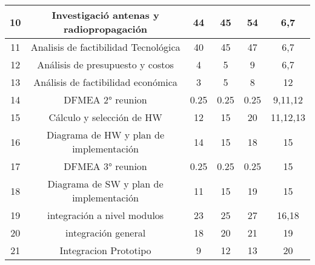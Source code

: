 \begin{table}[H]
\begin{tabular}{|c|c|c|c|c|c|}
10          & Investigació antenas y radiopropagación & 44                          & 45                & 54                          & 6,7                                       \\ \hline
11          & Analisis de factibilidad Tecnológica    & 40                          & 45                & 47                          & 6,7                                       \\ \hline
12          & Análisis de presupuesto y costos        & 4                           & 5                 & 9                           & 6,7                                       \\ \hline
13          & Análisis de factibilidad económica      & 3                           & 5                 & 8                           & 12                                        \\ \hline
14          & DFMEA 2° reunion                        & 0.25                        & 0.25              & 0.25                        & 9,11,12                                   \\ \hline
15          & Cálculo y selección de HW               & 12                          & 15                & 20                          & 11,12,13                                  \\ \hline
16          & Diagrama de HW y plan de implementación & 14                          & 15                & 18                          & 15                                        \\ \hline
17          & DFMEA 3° reunion                        & 0.25                        & 0.25              & 0.25                        & 15                                        \\ \hline
18          & Diagrama de SW y plan de implementación & 11                          & 15                & 19                          & 15                                        \\ \hline
19          & integración a nivel modulos             & 23                          & 25                & 27                          & 16,18                                     \\ \hline
20          & integración general                     & 18                          & 20                & 21                          & 19                                        \\ \hline
21          & Integracion Prototipo                   & 9                           & 12                & 13                          & 20                                        \\ \hline

\end{tabular}
\end{table}
